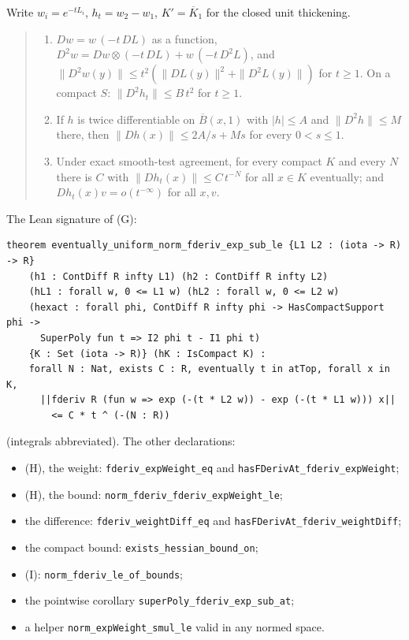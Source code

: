 \documentclass[11pt]{article}
\newcommand{\code}[1]{\texttt{#1}}
\begin{document}
Write $w_i = e^{-tL_i}$, $h_t = w_2 - w_1$, $K' = \overline{K}_1$ for
the closed unit thickening.

\begin{quote}\itshape
\begin{enumerate}
\item[(H)] $D w = w\,(-t\,DL)$ as a function, $D^2 w = Dw \otimes (-t\,DL)
+ w\,(-t\,D^2L)$, and $\|D^2 w(y)\| \le t^2(\|DL(y)\|^2 + \|D^2L(y)\|)$
for $t \ge 1$. On a compact $S$: $\|D^2 h_t\| \le B\,t^2$ for $t \ge 1$.
\item[(I)] If $h$ is twice differentiable on $\overline{B}(x,1)$ with
$|h| \le A$ and $\|D^2h\| \le M$ there, then $\|Dh(x)\| \le 2A/s + Ms$
for every $0 < s \le 1$.
\item[(G)] Under exact smooth-test agreement, for every compact $K$ and
every $N$ there is $C$ with $\|Dh_t(x)\| \le C\,t^{-N}$ for all $x \in K$
eventually; and $Dh_t(x)v = o(t^{-\infty})$ for all $x, v$.
\end{enumerate}
\end{quote}

\noindent The Lean signature of (G):
\begin{verbatim}
theorem eventually_uniform_norm_fderiv_exp_sub_le {L1 L2 : (iota -> R) -> R}
    (h1 : ContDiff R infty L1) (h2 : ContDiff R infty L2)
    (hL1 : forall w, 0 <= L1 w) (hL2 : forall w, 0 <= L2 w)
    (hexact : forall phi, ContDiff R infty phi -> HasCompactSupport phi ->
      SuperPoly fun t => I2 phi t - I1 phi t)
    {K : Set (iota -> R)} (hK : IsCompact K) :
    forall N : Nat, exists C : R, eventually t in atTop, forall x in K,
      ||fderiv R (fun w => exp (-(t * L2 w)) - exp (-(t * L1 w))) x||
        <= C * t ^ (-(N : R))
\end{verbatim}
(integrals abbreviated). The other declarations:
\begin{itemize}
\item (H), the weight: \code{fderiv\_expWeight\_eq} and
\code{hasFDerivAt\_fderiv\_expWeight};
\item (H), the bound: \code{norm\_fderiv\_fderiv\_expWeight\_le};
\item the difference: \code{fderiv\_weightDiff\_eq} and
\code{hasFDerivAt\_fderiv\_weightDiff};
\item the compact bound: \code{exists\_hessian\_bound\_on};
\item (I): \code{norm\_fderiv\_le\_of\_bounds};
\item the pointwise corollary \code{superPoly\_fderiv\_exp\_sub\_at};
\item a helper \code{norm\_expWeight\_smul\_le} valid in any normed space.
\end{itemize}
\end{document}
